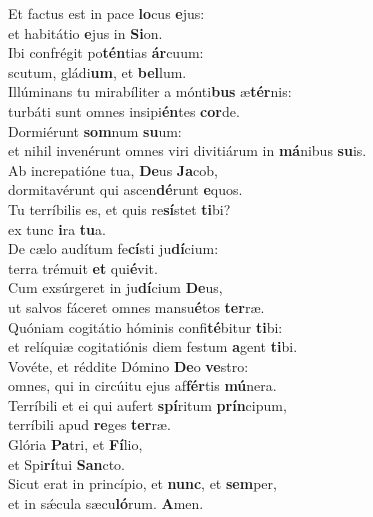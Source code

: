\evenverse Et factus est in pace \textbf{lo}cus \textbf{e}jus:~\*\\
\evenverse et habitátio \textbf{e}jus in \textbf{Si}on.\\
\oddverse Ibi confrégit po\textbf{tén}tias \textbf{ár}cuum:~\*\\
\oddverse scutum, gládi\textbf{um}, et \textbf{bel}lum.\\
\evenverse Illúminans tu mirabíliter a mónti\textbf{bus} æ\textbf{tér}nis:~\*\\
\evenverse turbáti sunt omnes insipi\textbf{én}tes \textbf{cor}de.\\
\oddverse Dormiérunt \textbf{som}num \textbf{su}um:~\*\\
\oddverse et nihil invenérunt omnes viri divitiárum in \textbf{má}nibus \textbf{su}is.\\
\evenverse Ab increpatióne tua, \textbf{De}us \textbf{Ja}cob,~\*\\
\evenverse dormitavérunt qui ascen\textbf{dé}runt \textbf{e}quos.\\
\oddverse Tu terríbilis es, et quis re\textbf{sí}stet \textbf{ti}bi?~\*\\
\oddverse ex tunc \textbf{i}ra \textbf{tu}a.\\
\evenverse De cælo audítum fe\textbf{cí}sti ju\textbf{dí}cium:~\*\\
\evenverse terra trémuit \textbf{et} qui\textbf{é}vit.\\
\oddverse Cum exsúrgeret in ju\textbf{dí}cium \textbf{De}us,~\*\\
\oddverse ut salvos fáceret omnes mansu\textbf{é}tos \textbf{ter}ræ.\\
\evenverse Quóniam cogitátio hóminis confi\textbf{té}bitur \textbf{ti}bi:~\*\\
\evenverse et relíquiæ cogitatiónis diem festum \textbf{a}gent \textbf{ti}bi.\\
\oddverse Vovéte, et réddite Dómino \textbf{De}o \textbf{ve}stro:~\*\\
\oddverse omnes, qui in circúitu ejus af\textbf{fér}tis \textbf{mú}nera.\\
\evenverse Terríbili et ei qui aufert \textbf{spí}ritum \textbf{prín}cipum,~\*\\
\evenverse terríbili apud \textbf{re}ges \textbf{ter}ræ.\\
\oddverse Glória \textbf{Pa}tri, et \textbf{Fí}lio,~\*\\
\oddverse et Spi\textbf{rí}tui \textbf{San}cto.\\
\evenverse Sicut erat in princípio, et \textbf{nunc}, et \textbf{sem}per,~\*\\
\evenverse et in sǽcula sæcu\textbf{ló}rum. \textbf{A}men.\\
